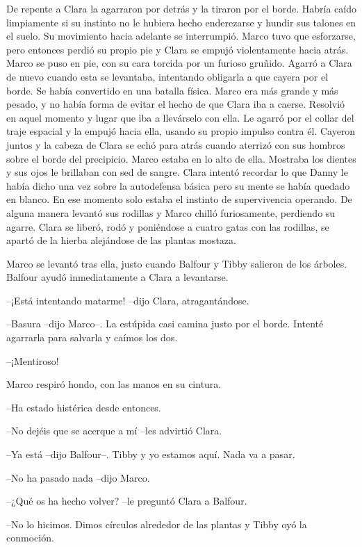 {De repente a Clara la agarraron por detrás y la tiraron por el borde.
 Habría caído limpiamente si su instinto no le hubiera hecho enderezarse
 y hundir sus talones en el suelo. Su movimiento hacia adelante se
 interrumpió. Marco tuvo que esforzarse, pero entonces perdió su propio
 pie y Clara se empujó violentamente hacia atrás. Marco se puso en pie,
 con su cara torcida por un furioso gruñido. Agarró a Clara de nuevo
 cuando esta se levantaba, intentando obligarla a que cayera por el
 borde. Se había convertido en una batalla física. Marco era más grande y
 más pesado, y no había forma de evitar el hecho de que Clara iba a
 caerse. Resolvió en aquel momento y lugar que iba a llevárselo con ella.
 Le agarró por el collar del traje espacial y la empujó hacia ella,
 usando su propio impulso contra él. Cayeron juntos y la cabeza de Clara
 se echó para atrás cuando aterrizó con sus hombros sobre el borde del
 precipicio. Marco estaba en lo alto de ella. Mostraba los dientes y sus
 ojos le brillaban con sed de sangre. Clara intentó recordar lo que Danny
 le había dicho una vez sobre la autodefensa básica pero su mente se
 había quedado en blanco. En ese momento solo estaba el instinto de
 supervivencia operando. De alguna manera levantó sus rodillas y Marco
 chilló furiosamente, perdiendo su agarre. Clara se liberó, rodó y
 poniéndose a cuatro gatas con las rodillas, se apartó de la hierba
alejándose de las plantas mostaza.}

{Marco se levantó tras ella, justo cuando Balfour y Tibby salieron de los
árboles. Balfour ayudó inmediatamente a Clara a levantarse.}

{--¡Está intentando matarme! --dijo Clara, atragantándose.}

{--Basura --dijo Marco--. La estúpida casi camina justo por el borde.
Intenté agarrarla para salvarla y caímos los dos.}

{--¡Mentiroso!}

{Marco respiró hondo, con las manos en su cintura.}

{--Ha estado histérica desde entonces.}

{--No dejéis que se acerque a mí --les advirtió Clara.}

{--Ya está --dijo Balfour--. Tibby y yo estamos aquí. Nada va a pasar.}

{--No ha pasado nada --dijo Marco.}

{--¿Qué os ha hecho volver? --le preguntó Clara a Balfour.}

{--No lo hicimos. Dimos círculos alrededor de las plantas y Tibby oyó la
conmoción.}

